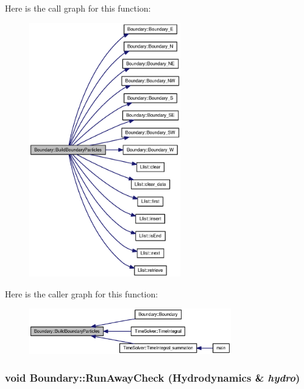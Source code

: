 Here is the call graph for this function:\nopagebreak
\begin{figure}[H]
\begin{center}
\leavevmode
\includegraphics[width=186pt]{classBoundary_8a40f99b73f3622cd5f1387fcbbdb824_cgraph}
\end{center}
\end{figure}


Here is the caller graph for this function:\nopagebreak
\begin{figure}[H]
\begin{center}
\leavevmode
\includegraphics[width=248pt]{classBoundary_8a40f99b73f3622cd5f1387fcbbdb824_icgraph}
\end{center}
\end{figure}
\hypertarget{classBoundary_ac37e18aaf60503a66173d9428ed9e54}{
\subsubsection[{RunAwayCheck}]{\setlength{\rightskip}{0pt plus 5cm}void Boundary::RunAwayCheck ({\bf Hydrodynamics} \& {\em hydro})}}
\label{classBoundary_ac37e18aaf60503a66173d9428ed9e54}



